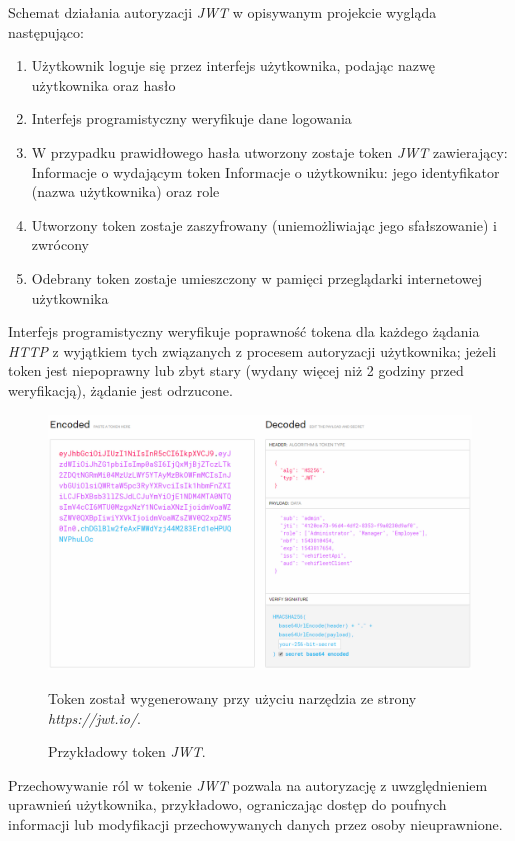 \documentclass[eng,printmode,openany]{mgr}
\begin{document}
	Schemat działania autoryzacji \textit{JWT} w opisywanym projekcie wygląda następująco:
	\begin{enumerate}
		\item Użytkownik loguje się przez interfejs użytkownika, podając nazwę użytkownika oraz hasło
		\item Interfejs programistyczny weryfikuje dane logowania
		\item W przypadku prawidłowego hasła utworzony zostaje token \textit{JWT} zawierający:
		\subitem Informacje o wydającym token
		\subitem Informacje o użytkowniku: jego identyfikator (nazwa użytkownika) oraz role
		\item Utworzony token zostaje zaszyfrowany (uniemożliwiając jego sfałszowanie) i zwrócony	
		\item Odebrany token zostaje umieszczony w pamięci przeglądarki internetowej użytkownika
	\end{enumerate}
	Interfejs programistyczny weryfikuje poprawność tokena dla każdego żądania \textit{HTTP} z wyjątkiem tych związanych z procesem autoryzacji użytkownika; jeżeli token jest niepoprawny lub zbyt stary (wydany więcej niż 2 godziny przed weryfikacją), żądanie jest odrzucone.
	
	\begin{figure}[H]
		\centering
		\includegraphics[width=\textwidth]{images/jwt.png}
		\caption{Przykładowy token \textit{JWT}.}
		\small 
		Token został wygenerowany przy użyciu narzędzia ze strony \textit{https://jwt.io/}.
	\end{figure}
	
	Przechowywanie ról w tokenie \textit{JWT} pozwala na autoryzację z uwzględnieniem uprawnień użytkownika, przykładowo, ograniczając dostęp do poufnych informacji lub modyfikacji przechowywanych danych przez osoby nieuprawnione.
	
\end{document}
